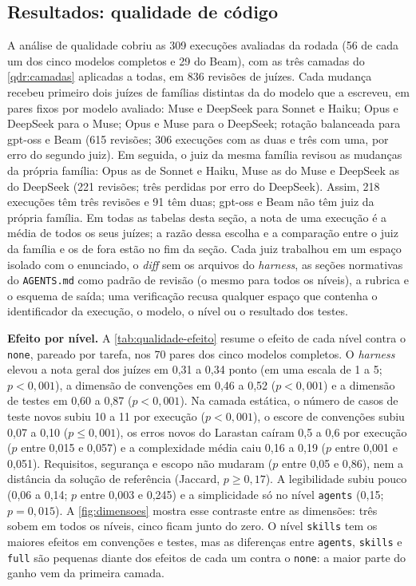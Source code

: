\subsection{Resultados: qualidade de código}
\label{sec:resultados-qualidade}
\label{sec:qualidade-metodo}

A análise de qualidade cobriu as 309 execuções avaliadas da rodada (56 de cada
um dos cinco modelos completos e 29 do Beam), com as três camadas do
\autoref{qdr:camadas} aplicadas a todas, em 836 revisões de juízes. Cada
mudança recebeu primeiro dois juízes de famílias distintas da do modelo que a
escreveu, em pares fixos por modelo avaliado: Muse e DeepSeek para Sonnet e
Haiku; Opus e DeepSeek para o Muse; Opus e Muse para o DeepSeek; rotação
balanceada para gpt-oss e Beam (615 revisões; 306 execuções com as duas e três
com uma, por erro do segundo juiz). Em seguida, o juiz da mesma família revisou
as mudanças da própria família: Opus as de Sonnet e Haiku, Muse as do Muse e
DeepSeek as do DeepSeek (221 revisões; três perdidas por erro do DeepSeek).
Assim, 218 execuções têm três revisões e 91 têm duas; gpt-oss e Beam não têm
juiz da própria família. Em todas as tabelas desta seção, a nota de uma
execução é a média de todos os seus juízes; a razão dessa escolha e a
comparação entre o juiz da família e os de fora estão no fim da seção. Cada
juiz trabalhou em um espaço isolado com o enunciado,
o \textit{diff} sem os arquivos do \textit{harness}, as seções normativas do
\texttt{AGENTS.md} como padrão de revisão (o mesmo para todos os níveis), a
rubrica e o esquema de saída; uma verificação recusa qualquer espaço que
contenha o identificador da execução, o modelo, o nível ou o resultado dos
testes.

\textbf{Efeito por nível.} A \autoref{tab:qualidade-efeito} resume o efeito de
cada nível contra o \texttt{none}, pareado por tarefa, nos 70 pares dos cinco
modelos completos. O \textit{harness} elevou a nota geral dos juízes em 0,31 a
0,34 ponto (em uma escala de 1 a 5; $p < 0{,}001$), a dimensão de convenções
em 0,46 a 0,52 ($p < 0{,}001$) e a dimensão de testes em 0,60 a 0,87
($p < 0{,}001$). Na camada estática, o número de casos de teste novos subiu 10
a 11 por execução ($p < 0{,}001$), o escore de convenções subiu 0,07 a 0,10
($p \le 0{,}001$), os erros novos do Larastan caíram 0,5 a 0,6 por execução
($p$ entre 0,015 e 0,057) e a complexidade média caiu 0,16 a 0,19 ($p$ entre
0,001 e 0,051). Requisitos, segurança e escopo não mudaram ($p$ entre 0,05 e
0,86), nem a distância da solução de referência (Jaccard, $p \ge 0{,}17$). A
legibilidade subiu pouco (0,06 a 0,14; $p$ entre 0,003 e 0,245) e a
simplicidade só no nível \texttt{agents} (0,15; $p = 0{,}015$). A \autoref{fig:dimensoes} mostra esse contraste entre as
dimensões: três sobem em todos os níveis, cinco ficam junto do zero. O nível
\texttt{skills} tem os maiores efeitos em convenções e testes, mas as diferenças
entre \texttt{agents}, \texttt{skills} e \texttt{full} são pequenas diante dos
efeitos de cada um contra o \texttt{none}: a maior parte do ganho vem da
primeira camada.

